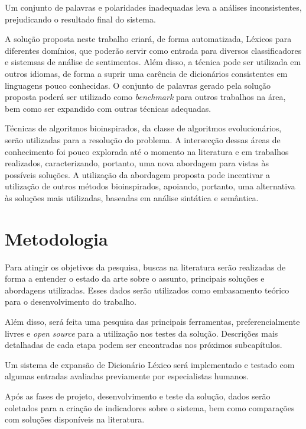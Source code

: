 \documentclass[a4paper,11pt]{article}
\begin{document}
Um conjunto de palavras e polaridades inadequadas leva a análises inconsistentes, prejudicando o resultado final do sistema.

A solução proposta neste trabalho criará, de forma automatizada, Léxicos para diferentes domínios, que poderão servir como entrada para diversos classificadores e sistemsas de análise de sentimentos. Além disso, a técnica pode ser utilizada em outros idiomas, de forma a suprir uma carência de dicionários consistentes em linguagens pouco conhecidas.
O conjunto de palavras gerado pela solução proposta poderá ser utilizado como \emph{benchmark} para outros trabalhos na área, bem como ser expandido com outras técnicas adequadas.

Técnicas de algoritmos bioinspirados, da classe de algoritmos evolucionários, serão utilizadas para a resolução do problema. A intersecção dessas áreas de conhecimento foi pouco explorada até o momento na literatura e em trabalhos realizados, caracterizando, portanto, uma nova abordagem para vistas às possíveis soluções. A utilização da abordagem proposta pode incentivar a utilização de outros métodos bioinspirados, apoiando, portanto, uma alternativa às soluções mais utilizadas, baseadas em análise sintática e semântica.

\section{Metodologia}
\label{sec:met}
Para atingir os objetivos da pesquisa, buscas na literatura serão realizadas de forma a entender o estado da arte sobre o assunto, principais soluções e abordagens utilizadas. Esses dados serão utilizados como embasamento teórico para o desenvolvimento do trabalho. 

Além disso, será feita uma pesquisa das principais ferramentas, preferencialmente livres e \emph{open source} para a utilização nos testes da solução. Descrições mais detalhadas de cada etapa podem ser encontradas nos próximos subcapítulos.

Um sistema de expansão de Dicionário Léxico será implementado e testado com algumas entradas avaliadas previamente por especialistas humanos.

Após as fases de projeto, desenvolvimento e teste da solução, dados serão coletados para a criação de indicadores sobre o sistema, bem como comparações com soluções disponíveis na literatura.
\end{document}
